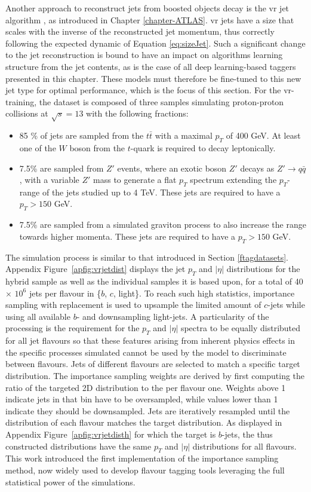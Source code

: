 Another approach to reconstruct jets from boosted objects decay is the \gls{vr} jet algorithm \cite{vrJetPaper}, as introduced in Chapter \ref{chapter-ATLAS}. \gls{vr} jets have a size that scales with the inverse of the reconstructed jet momentum, thus correctly following the expected dynamic of Equation \ref{eq:sizeJet}. Such a significant change to the jet reconstruction is bound to have an impact on algorithms learning structure from the jet contents, as is the case of all deep learning-based taggers presented in this chapter. These models must therefore be fine-tuned to this new jet type for optimal performance, which is the focus of this section. For the \gls{vr}-training, the dataset is composed of three samples simulating proton-proton collisions at $\sqrt{s} = 13$ with the following fractions:
\begin{itemize}
  \item 85 \% of jets are sampled from the $t\bar{t}$ with a maximal $p_T$ of 400 GeV. At least one of the $W$ boson from the $t$-quark is required to decay leptonically.
  \item 7.5\% are sampled from $Z'$ events, where an exotic boson $Z'$ decays as $Z' \rightarrow q\bar{q}$, with a variable $Z'$ mass to generate a flat $p_T$ spectrum extending the $p_T$-range of the jets studied up to 4 TeV. These jets are required to have a $p_T > 150$ GeV.
  \item 7.5\% are sampled from a simulated graviton process to also increase the range towards higher momenta. These jets are required to have a $p_T > 150$ GeV.
\end{itemize}

The simulation process is similar to that introduced in Section \ref{ftagdatasets}. Appendix Figure~\ref{apfig:vrjetdist} displays the jet $p_T$ and $|\eta|$ distributions for the hybrid sample as well as the individual samples it is based upon, for a total of 40 $\times$ $10^6$ jets per flavour in \{$b$, $c$, light\}. To reach such high statistics, importance sampling with replacement is used to upsample the limited amount of $c$-jets while using all available $b$- and downsampling light-jets. A particularity of the processing is the requirement for the $p_T$ and $|\eta|$ spectra to be equally distributed for all jet flavours so that these features arising from inherent physics effects in the specific processes simulated cannot be used by the model to discriminate between flavours. Jets of different flavours are selected to match a specific target distribution. The importance sampling weights are derived by first computing the ratio of the targeted 2D distribution to the per flavour one. Weights above 1 indicate jets in that bin have to be oversampled, while values lower than 1 indicate they should be downsampled. Jets are iteratively resampled until the distribution of each flavour matches the target distribution. As displayed in Appendix Figure~\ref{apfig:vrjetdisth} for which the target is $b$-jets, the thus constructed distributions have the same $p_T$ and $|\eta|$ distributions for all flavours. This work introduced the first implementation of the importance sampling method, now widely used to develop flavour tagging tools leveraging the full statistical power of the simulations. \\ 
 
